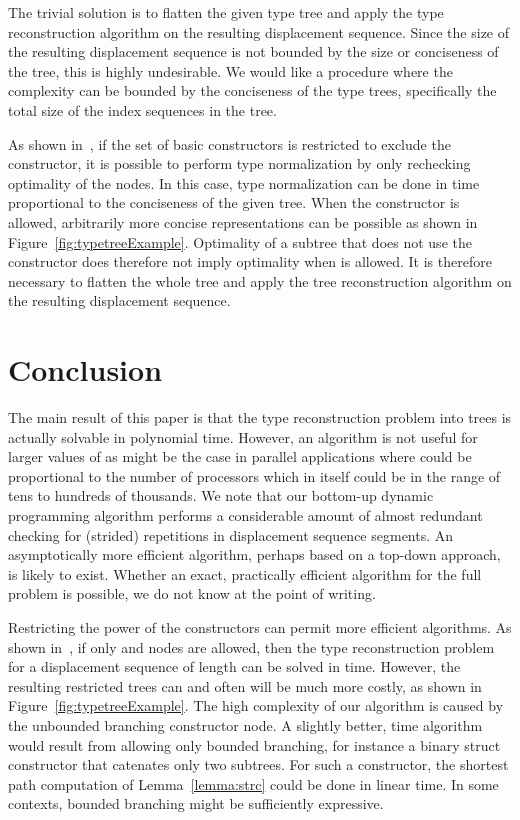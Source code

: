 \documentclass[a4paper,11pt]{article}
\begin{document}
The trivial solution is to flatten the given type tree and apply the
type reconstruction algorithm on the resulting displacement
sequence. Since the size of the resulting displacement sequence is not
bounded by the size or conciseness of the tree, this is highly
undesirable. We would like a procedure where the complexity can be
bounded by the conciseness of the type trees, specifically the total
size of the index sequences in the tree.

As shown in~\cite{Traff14:normalization}, if the set of basic
constructors is restricted to exclude the  constructor, it is
possible to perform type normalization by only rechecking optimality
of the  nodes.  In this case, type normalization can be done in
time proportional to the conciseness of the given tree. When the
 constructor is allowed, arbitrarily more concise
representations can be possible as shown in
Figure~\ref{fig:typetreeExample}. Optimality of a subtree that does
not use the  constructor does therefore not imply optimality
when  is allowed. It is therefore necessary to flatten the
whole tree and apply the tree reconstruction algorithm on the
resulting displacement sequence.

\section{Conclusion}
\label{sec:conclusion}

The main result of this paper is that the type reconstruction problem
into trees is actually solvable in polynomial time. However, an
 algorithm is not useful for larger values of  as might be
the case in parallel applications where  could be proportional to
the number of processors which in itself could be in the range of tens
to hundreds of thousands. We note that our bottom-up dynamic
programming algorithm performs a considerable amount of almost
redundant checking for (strided) repetitions in displacement sequence
segments. An asymptotically more efficient algorithm, perhaps based on
a top-down approach, is likely to exist. Whether an exact, practically
efficient algorithm for the full problem is possible, we do not know
at the point of writing.

Restricting the power of the constructors can permit more efficient
algorithms.  As shown in~\cite{Traff14:normalization}, if only
 and  nodes are allowed, then the type
reconstruction problem for a displacement sequence of length  can
be solved in  time. However, the resulting restricted
trees can and often will be much more costly, as shown in
Figure~\ref{fig:typetreeExample}. The high complexity of our algorithm
is caused by the unbounded branching constructor  node. A
slightly better,  time algorithm would result from allowing
only bounded branching, for instance a binary struct constructor that
catenates only two subtrees. For such a constructor, the shortest path
computation of Lemma~\ref{lemma:strc} could be done in linear time. In
some contexts, bounded branching might be sufficiently expressive.
\end{document}
